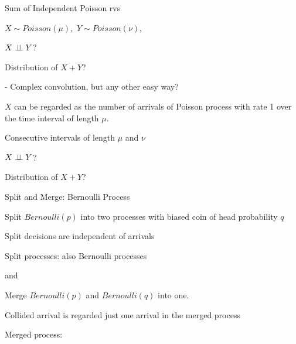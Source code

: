 \begin{frame}{Sum of Independent Poisson rvs}

\plitemsep 0.1in

\bci 

\item $X \sim Poisson(\mu),$  $Y \sim Poisson(\nu),$  

\item<2->  $X \perp \!\!\! \perp Y$?

\item<3->  Distribution of $X+Y$?

- Complex convolution, but any other easy way?

\item<4-> $X$ can be regarded as the number of arrivals of Poisson process with rate 1 over the time interval of length $\mu.$ 

\item<5-> Consecutive intervals of length $\mu$ and $\nu$

\item<6->  $X \perp \!\!\! \perp Y$? 

\item<7->  Distribution of $X+Y$? 

\eci 


\end{frame}


\begin{frame}{Split and Merge: Bernoulli Process}

{
\small
\plitemsep 0.05in
\bci
\item Split $Bernoulli(p)$ into two processes with biased coin of head probability $q$

\item<2-> Split decisions are independent of arrivals

\item<3-> Split processes: also Bernoulli processes

\item<3->  and 

\eci

\medskip
\centering
{}

}
{
\small
\plitemsep 0.05in
\bci
\item Merge $Bernoulli(p)$ and $Bernoulli(q)$ into one.

\item<4-> Collided arrival is regarded just one arrival in the merged process

\item<5-> Merged process: 
\eci

\centering
{}

}

\end{frame}

